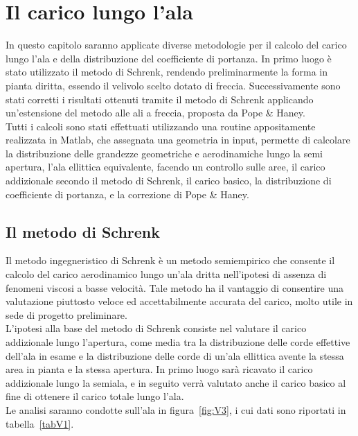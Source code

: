 
\chapter{Il carico lungo l'ala}
In questo capitolo saranno applicate diverse metodologie per il calcolo del carico lungo l'ala e della distribuzione del coefficiente di portanza. In primo luogo è stato utilizzato il metodo di Schrenk, rendendo preliminarmente la forma in pianta diritta, essendo il velivolo scelto dotato di freccia. Successivamente sono stati corretti i risultati ottenuti tramite il metodo di Schrenk applicando un'estensione del metodo alle ali a freccia, proposta da Pope \& Haney.\\
Tutti i calcoli sono stati effettuati utilizzando una routine appositamente realizzata in Matlab, che assegnata una geometria in input, permette di calcolare la distribuzione delle grandezze geometriche e aerodinamiche lungo la semi apertura, l'ala ellittica equivalente, facendo un controllo sulle aree, il carico addizionale secondo il metodo di Schrenk, il carico basico, la distribuzione di coefficiente di portanza, e la correzione di Pope \& Haney.

\section{Il metodo di Schrenk}

Il metodo ingegneristico di Schrenk è un metodo semiempirico che consente il calcolo del carico aerodinamico lungo un'ala dritta nell’ipotesi di assenza di fenomeni viscosi a basse velocità. Tale metodo ha il vantaggio di consentire una valutazione piuttosto veloce ed accettabilmente accurata del carico, molto utile in sede di progetto preliminare.\\
L'ipotesi alla base del metodo di Schrenk consiste nel valutare il carico addizionale lungo l'apertura, come media tra la distribuzione delle corde effettive dell'ala in esame e la distribuzione delle corde di un'ala ellittica avente la stessa area in pianta e la stessa apertura.
In primo luogo sarà ricavato il carico addizionale lungo la semiala, e in seguito verrà valutato anche il carico basico al fine di ottenere il carico totale lungo l’ala. \\ Le analisi saranno condotte sull'ala in figura~\vref{fig:V3}, i cui dati sono riportati in tabella~\vref{tabV1}. 

